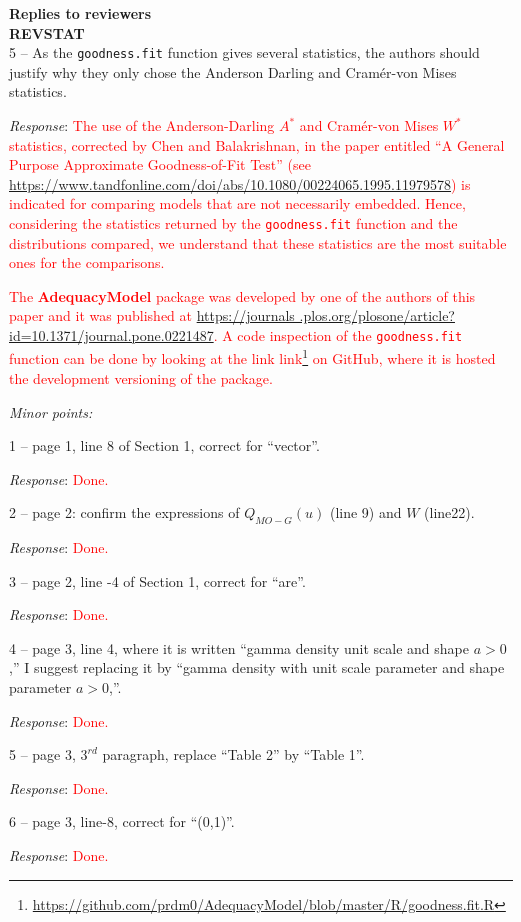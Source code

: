 \documentclass[version=last,12pt,{"maintainersDelight"}]{scrlttr2}
\renewcommand{\href}[2]{#2\footnote{\url{#1}}}
\begin{document}
\begin{letter}{\textbf{Replies to reviewers}\\\textbf{REVSTAT}\\}
5 -- As the \texttt{goodness.fit} function gives several statistics, the authors should justify why they only chose the Anderson Darling and Cram\'er-von Mises statistics.

\emph{Response}:
\textcolor{red}{The use of the Anderson-Darling  $A^*$ and Cram\'er-von Mises $W^*$  statistics, corrected by Chen and Balakrishnan, in the paper entitled ``A General Purpose Approximate Goodness-of-Fit Test'' (see   \url{https://www.tandfonline.com/doi/abs/10.1080/00224065.1995.11979578}) is indicated for comparing mo\-dels that are not necessarily embedded. Hence, considering the statistics returned by the \texttt{goodness.fit} function and the distributions compared, we understand that these statistics are the most suitable ones for 
the comparisons.}

\textcolor{red}{The \textbf{AdequacyModel} package was developed 
by one of the authors of this paper and it was published at   \url{https://journals .plos.org/plosone/article?id=10.1371/journal.pone.0221487}. 
A code inspection of the \texttt{goodness.fit} function can be done by looking at the link   \href{https://github.com/prdm0/AdequacyModel/blob/master/R/goodness.fit.R}{link} on GitHub, where it is hosted the development versioning of the package.}

\emph{Minor points:}

1 -- page 1, line 8 of Section 1, correct for ``vector''.

\emph{Response}: \textcolor{red}{Done.}

2 -- page 2: confirm the expressions of \(Q_{MO-G}(u)\) (line 9) and
\(W\) (line22).

\emph{Response}: \textcolor{red}{Done.}

3 -- page 2, line -4 of Section 1, correct for ``are''.

\emph{Response}: \textcolor{red}{Done.}

4 -- page 3, line 4, where it is written ``gamma density unit scale and shape \(a>0\),'' I suggest replacing it by ``gamma density with unit scale parameter and shape parameter \(a>0\),''.

\emph{Response}: \textcolor{red}{Done.}

5 -- page 3, \(3^{rd}\) paragraph, replace ``Table 2'' by ``Table 1''.

\emph{Response}: \textcolor{red}{Done.}

6 -- page 3, line-8, correct for ``(0,1)''.

\emph{Response}: \textcolor{red}{Done.}


\end{letter}
\end{document}
